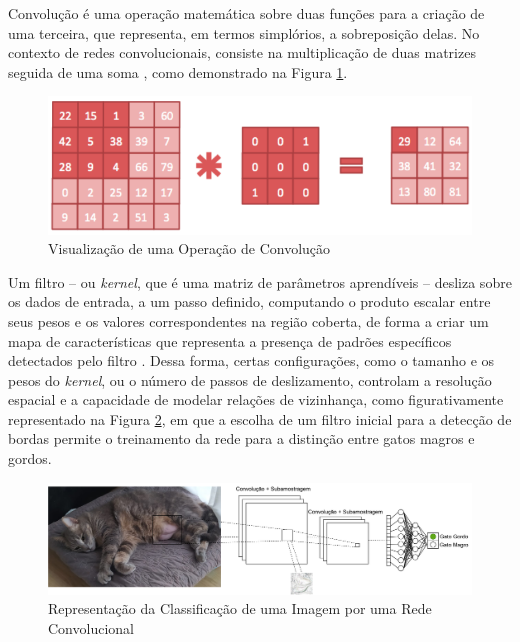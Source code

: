 Convolução é uma operação matemática sobre duas funções para a criação de uma terceira, que representa, em termos simplórios, a sobreposição delas. No contexto de redes convolucionais, consiste na multiplicação de duas matrizes seguida de uma soma \cite{origindl}, como demonstrado na Figura \ref{fig:convolution}.

\begin{figure}[H]
	\caption{\label{fig:convolution}Visualização de uma Operação de Convolução}
    \begin{center}
    \includegraphics[width=0.75\linewidth]{images/convolution.png}
	\end{center}
\end{figure}


Um filtro -- ou \textit{kernel}, que é uma matriz de parâmetros aprendíveis -- desliza sobre os dados de entrada, a um passo definido, computando o produto escalar entre seus pesos e os valores correspondentes na região coberta, de forma a criar um mapa de características que representa a presença de padrões específicos detectados pelo filtro \cite{deeplearningbook}. Dessa forma, certas configurações, como o tamanho e os pesos do \textit{kernel}, ou o número de passos de deslizamento, controlam a resolução espacial e a capacidade de modelar relações de vizinhança, como figurativamente representado na Figura \ref{fig:nono}, em que a escolha de um filtro inicial para a detecção de bordas permite o treinamento da rede para a distinção entre gatos magros e gordos.

\begin{figure}[H]
	\caption{\label{fig:nono}Representação da Classificação de uma Imagem por uma Rede Convolucional}
    \begin{center}
    \includegraphics[width=1\linewidth]{images/nono.png}
	\end{center}
\end{figure}

